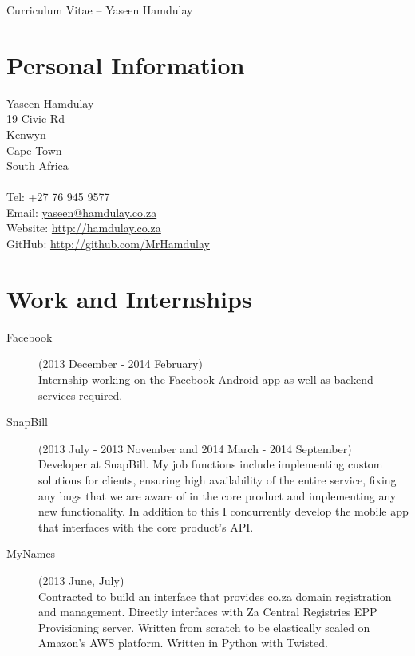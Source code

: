 \documentclass[margin,line,a4paper]{resume}
\begin{document}
    {\sc \Large Curriculum Vitae -- Yaseen Hamdulay}
    \begin{resume}
        \vspace{0.5cm}

        \section{\mysidestyle Personal Information}
            Yaseen Hamdulay\\
            19 Civic Rd\\ %
            Kenwyn\\
            Cape Town\\
            South Africa\\
            \\
            Tel: +27 76 945 9577\\
            Email: \href{mailto:yaseen@hamdulay.co.za}{yaseen@hamdulay.co.za}\\
            Website: \href{http://hamdulay.co.za}{http://hamdulay.co.za}\\
            GitHub: \href{http://github.com/MrHamdulay}{http://github.com/MrHamdulay}\\

        \section{\mysidestyle Work and Internships}
            \begin{description}
                \item[Facebook] (2013 December - 2014 February) \\
                    Internship working on the Facebook Android app as well as backend services required.

                \item[SnapBill] (2013 July - 2013 November and 2014 March - 2014 September) \\
                    Developer at SnapBill. My job functions include implementing custom solutions for clients,
                    ensuring high availability of the entire service, fixing any bugs that we are aware of in the
                    core product and implementing any new functionality. In addition to this I concurrently develop
                    the mobile app that interfaces with the core product's API.

                \item[MyNames] (2013 June, July) \\
                    Contracted to build an interface that provides co.za domain registration and management. 
                    Directly interfaces with Za Central Registries EPP Provisioning server. Written from scratch
                    to be elastically scaled on Amazon's AWS platform. Written in Python with Twisted.


\end{description}
\end{resume}
\end{document}
